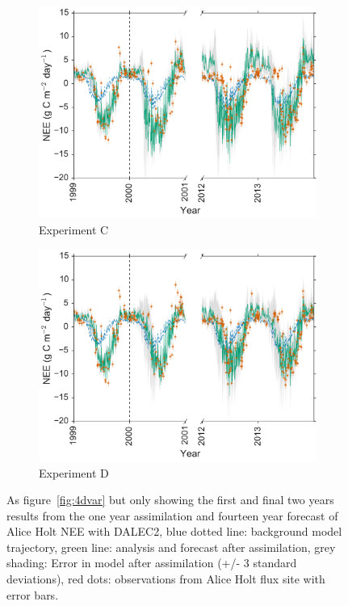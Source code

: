 \documentclass[review]{elsarticle}
\begin{document}
\begin{figure}
\begin{subfigure}[b]{0.49\textwidth}
        \includegraphics[width=\textwidth]{Cbroke4dvar2.pdf}
        \caption{Experiment C}
        \label{fig:broke4dvarBcorR}
    \end{subfigure}
    \begin{subfigure}[b]{0.49\textwidth}
        \includegraphics[width=\textwidth]{Dbroke4dvar2.pdf}
        \caption{Experiment D}
        \label{fig:broke4dvaredcBcorR}
    \end{subfigure}
    \caption{As figure~\ref{fig:4dvar} but only showing the first and final two years results from the one year assimilation and fourteen year forecast of Alice Holt NEE with DALEC2, blue dotted line: background model trajectory, green line: analysis and forecast after assimilation, grey shading: Error in model after assimilation (+/- 3 standard deviations), red dots: observations from Alice Holt flux site with error bars.}\label{fig:broke4dvar}
\end{figure}
\end{document}
